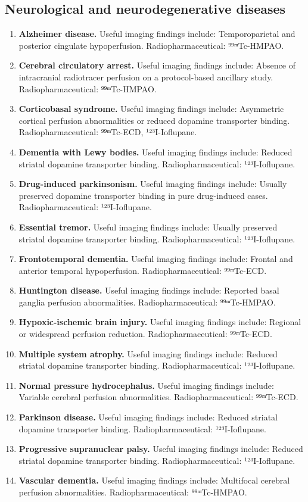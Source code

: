 \subsection{Neurological and neurodegenerative diseases}
\begin{enumerate}[leftmargin=*,itemsep=0.45em,topsep=0.4em]
\item \textbf{Alzheimer disease.} Useful imaging findings include: Temporoparietal and posterior cingulate hypoperfusion. Radiopharmaceutical: ⁹⁹ᵐTc-HMPAO.
\item \textbf{Cerebral circulatory arrest.} Useful imaging findings include: Absence of intracranial radiotracer perfusion on a protocol-based ancillary study. Radiopharmaceutical: ⁹⁹ᵐTc-HMPAO.
\item \textbf{Corticobasal syndrome.} Useful imaging findings include: Asymmetric cortical perfusion abnormalities or reduced dopamine transporter binding. Radiopharmaceutical: ⁹⁹ᵐTc-ECD, ¹²³I-Ioflupane.
\item \textbf{Dementia with Lewy bodies.} Useful imaging findings include: Reduced striatal dopamine transporter binding. Radiopharmaceutical: ¹²³I-Ioflupane.
\item \textbf{Drug-induced parkinsonism.} Useful imaging findings include: Usually preserved dopamine transporter binding in pure drug-induced cases. Radiopharmaceutical: ¹²³I-Ioflupane.
\item \textbf{Essential tremor.} Useful imaging findings include: Usually preserved striatal dopamine transporter binding. Radiopharmaceutical: ¹²³I-Ioflupane.
\item \textbf{Frontotemporal dementia.} Useful imaging findings include: Frontal and anterior temporal hypoperfusion. Radiopharmaceutical: ⁹⁹ᵐTc-ECD.
\item \textbf{Huntington disease.} Useful imaging findings include: Reported basal ganglia perfusion abnormalities. Radiopharmaceutical: ⁹⁹ᵐTc-HMPAO.
\item \textbf{Hypoxic-ischemic brain injury.} Useful imaging findings include: Regional or widespread perfusion reduction. Radiopharmaceutical: ⁹⁹ᵐTc-ECD.
\item \textbf{Multiple system atrophy.} Useful imaging findings include: Reduced striatal dopamine transporter binding. Radiopharmaceutical: ¹²³I-Ioflupane.
\item \textbf{Normal pressure hydrocephalus.} Useful imaging findings include: Variable cerebral perfusion abnormalities. Radiopharmaceutical: ⁹⁹ᵐTc-ECD.
\item \textbf{Parkinson disease.} Useful imaging findings include: Reduced striatal dopamine transporter binding. Radiopharmaceutical: ¹²³I-Ioflupane.
\item \textbf{Progressive supranuclear palsy.} Useful imaging findings include: Reduced striatal dopamine transporter binding. Radiopharmaceutical: ¹²³I-Ioflupane.
\item \textbf{Vascular dementia.} Useful imaging findings include: Multifocal cerebral perfusion abnormalities. Radiopharmaceutical: ⁹⁹ᵐTc-HMPAO.
\end{enumerate}
